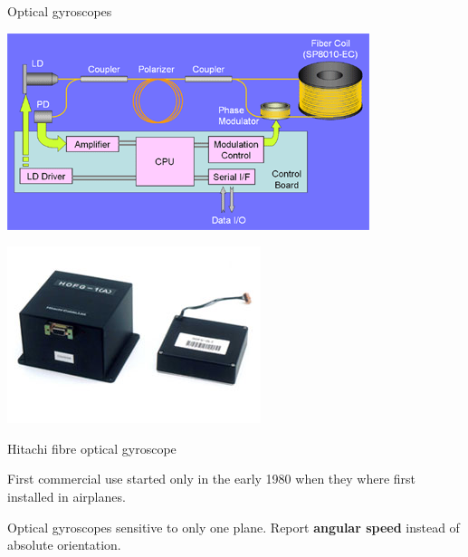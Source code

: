 \documentclass[compress]{beamer}
\begin{document}
\begin{frame}{Optical gyroscopes}

    \begin{multicols}{2}

        \begin{center}
            \includegraphics[width=0.9\linewidth]{optical-gyro}
        \end{center}

        \begin{center}
            \includegraphics[width=0.7\linewidth]{optical-gyro2}
        \end{center}

        {\footnotesize Hitachi fibre optical gyroscope}

        \vfill
        \columnbreak

        First commercial use started only in the early 1980 when they where
        first installed in airplanes.

        Optical gyroscopes sensitive to only one plane. Report {\bf angular speed}
        instead of absolute orientation.


    \end{multicols}

\end{frame}
\end{document}
